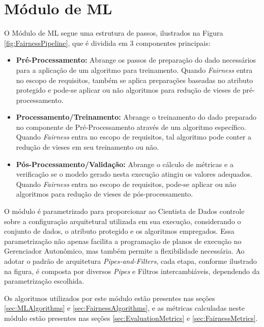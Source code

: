 \documentclass[Portugues,Final]{ic-tese-v3}
\begin{document}
\section{Módulo de ML}
\label{sec:ModuloML}

O Módulo de ML segue uma estrutura de passos, ilustrados na Figura \ref{fig:FairnessPipeline}, que é dividida em 3 componentes principais:

\begin{itemize}
	\item \textbf{Pré-Processamento:} Abrange os passos de preparação do dado necessários para a aplicação de um algoritmo para treinamento. Quando \textit{Fairness} entra no escopo de requisitos, também se aplica preparações baseadas no atributo protegido e pode-se aplicar ou não algoritmos para redução de vieses de pré-processamento.
	\item \textbf{Processamento/Treinamento:} Abrange o treinamento do dado preparado no componente de Pré-Processamento através de um algoritmo específico. Quando \textit{Fairness} entra no escopo de requisitos, tal algoritmo pode conter a redução de vieses em seu treinamento ou não.
	\item \textbf{Pós-Processamento/Validação:} Abrange o cálculo de métricas e a verificação se o modelo gerado nesta execução atingiu os valores adequados. Quando \textit{Fairness} entra no escopo de requisitos, pode-se aplicar ou não algoritmos para redução de vieses de pós-processamento.
\end{itemize}

O módulo é parametrizado para proporcionar ao Cientista de Dados controle sobre a configuração arquitetural utilizada em sua execução, considerando o conjunto de dados, o atributo protegido e os algoritmos empregados. Essa parametrização não apenas facilita a programação de planos de execução no Gerenciador Autonômico, mas também permite a flexibilidade necessária. Ao adotar o padrão de arquitetura \textit{Pipes-and-Filters}, cada etapa, conforme ilustrado na figura, é composta por diversos \textit{Pipes} e Filtros intercambiáveis, dependendo da parametrização escolhida.

Os algoritmos utilizados por este módulo estão presentes nas seções \ref{sec:MLAlgorithms} e \ref{sec:FairnessAlgorithms}, e as métricas calculadas neste módulo estão presentes nas seções \ref{sec:EvaluationMetrics} e \ref{sec:FairnessMetrics}.
\end{document}
